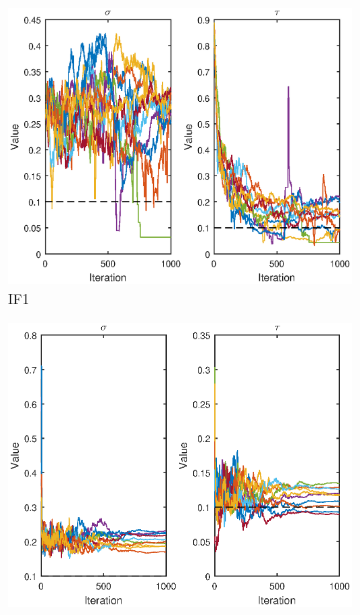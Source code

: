 \documentclass[twoside,openright]{report}
\begin{document}
\begin{figure}
        \centering
        \begin{subfigure}[b]{0.7\textwidth}
            \centering
            \includegraphics[width=\textwidth]{./fig_gompertz/IF1_2_par}
            \caption[]%
            { \small IF1 }     
            \label{fig:mean and std of net14}
        \end{subfigure}
        \begin{subfigure}[b]{0.7\textwidth}  
            \centering 
            \includegraphics[width=\textwidth]{./fig_gompertz/IF2_2_par}

\end{subfigure}
\end{figure}
\end{document}
